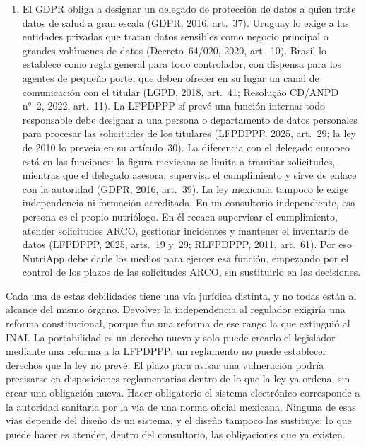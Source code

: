 \documentclass[12pt, a4paper]{article}
\begin{document}
\begin{enumerate}[label=\Roman*.]
  \item El GDPR obliga a designar un delegado de protección de datos
  a quien trate datos de salud a gran escala (GDPR, 2016, art.~37).
  Uruguay lo exige a las entidades privadas que tratan datos
  sensibles como negocio principal o grandes volúmenes de datos
  (Decreto~64/020, 2020, art.~10). Brasil lo establece como regla
  general para todo controlador, con dispensa para los agentes de
  pequeño porte, que
  deben ofrecer en su lugar un canal de comunicación con el titular
  (LGPD, 2018, art.~41; Resolução CD/ANPD n°~2, 2022, art.~11). La
  LFPDPPP sí prevé una función interna: todo responsable debe
  designar a una persona o departamento de datos personales para
  procesar las solicitudes de los titulares (LFPDPPP, 2025, art.~29;
  la ley de 2010 lo preveía en su artículo~30). La diferencia con el
  delegado europeo está en las funciones: la figura mexicana se limita a
  tramitar solicitudes, mientras que el delegado asesora, supervisa el
  cumplimiento y sirve de enlace con la autoridad (GDPR, 2016, art.~39).
  La ley mexicana tampoco le exige independencia ni formación acreditada.
  En un consultorio independiente, esa persona es el propio nutriólogo. En
  él recaen supervisar el cumplimiento, atender solicitudes ARCO,
  gestionar incidentes y mantener el inventario de datos (LFPDPPP, 2025,
  arts.~19 y~29; RLFPDPPP, 2011, art.~61). Por eso NutriApp debe darle los
  medios para ejercer esa función, empezando por el control de los plazos
  de las solicitudes ARCO, sin sustituirlo en las decisiones.
 
\end{enumerate}
 
Cada una de estas debilidades tiene una vía jurídica distinta, y no
todas están al alcance del mismo órgano. Devolver la independencia
al regulador exigiría una reforma constitucional, porque fue una
reforma de ese rango la que extinguió al INAI. La portabilidad es un
derecho nuevo y solo puede crearlo el legislador mediante una
reforma a la LFPDPPP; un reglamento no puede establecer derechos que
la ley no prevé. El plazo para avisar una vulneración podría
precisarse en disposiciones reglamentarias dentro de lo que la ley
ya ordena, sin crear una obligación nueva. Hacer obligatorio el
sistema electrónico corresponde a la autoridad sanitaria por la vía
de una norma oficial mexicana. Ninguna de esas vías depende del
diseño de un sistema, y el diseño tampoco las sustituye: lo que
puede hacer es atender, dentro del consultorio, las obligaciones que
ya existen.
 
\end{document}
